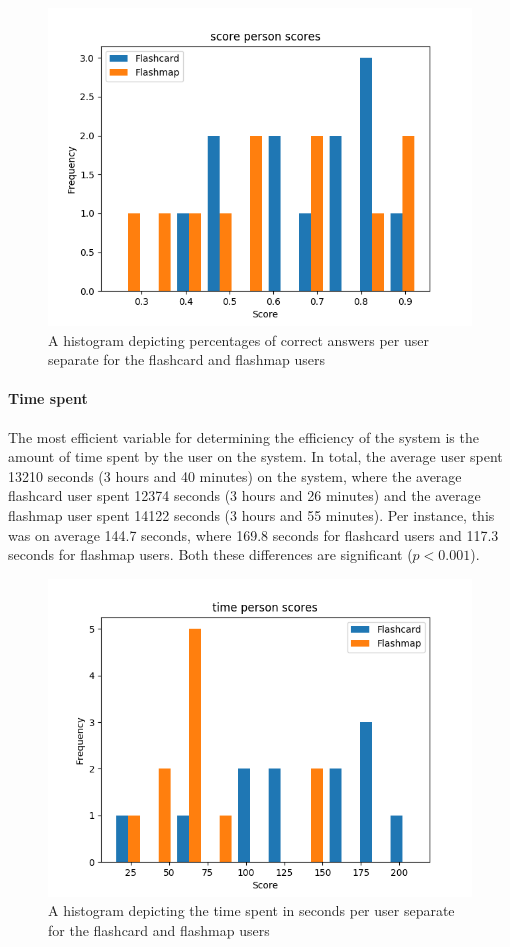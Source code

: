 \begin{figure}
    \centering
    \includegraphics[width=.7\textwidth]{img/score_abil.png}
    \caption{A histogram depicting percentages of correct answers per user separate for the flashcard and flashmap users}
    \label{fig:score_abil}
\end{figure}

\paragraph{Time spent} The most efficient variable for determining the efficiency of the system is the amount of time spent by the user on the system. In total, the average user spent 13210 seconds (3 hours and 40 minutes) on the system, where the average flashcard user spent 12374 seconds (3 hours and 26 minutes) and the average flashmap user spent 14122 seconds (3 hours and 55 minutes). Per instance, this was on average 144.7 seconds, where 169.8 seconds for flashcard users and 117.3 seconds for flashmap users. Both these differences are significant ($p<0.001$).

\begin{figure}
    \centering
    \includegraphics[width=.7\textwidth]{img/time_abil.png}
    \caption{A histogram depicting the time spent in seconds per user separate for the flashcard and flashmap users}
    \label{fig:time_abil}
\end{figure}

